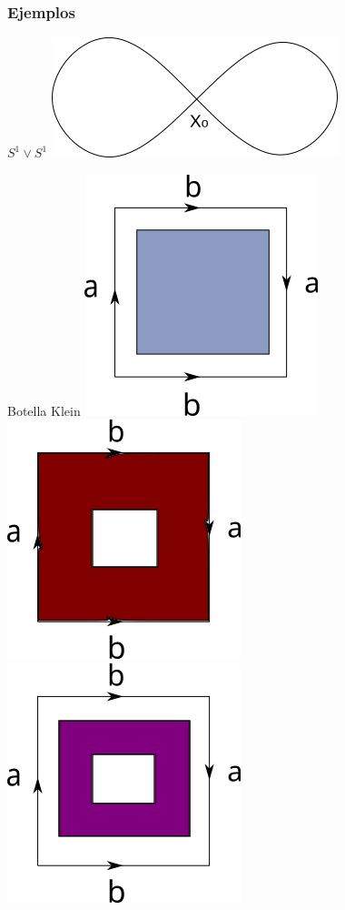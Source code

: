 \documentclass[xetex,mathserif,serif]{beamer}
\begin{document}
  \begin{frame}
    \frametitle{Ejemplos}
    \begin{block}{\(S^1 \vee S^1\)}
      \centering \includegraphics[scale=0.5]{../tesis/imagenes/figura8.png}
    \end{block}

    \pause
    \begin{block}{Botella Klein}
      \centering
      \includegraphics[scale=0.3]{../tesis/imagenes/kleinU.png}
      \hspace{3mm}
      \includegraphics[scale=0.3]{../tesis/imagenes/kleinV.png}
      \hspace{3mm}
      \includegraphics[scale=0.3]{../tesis/imagenes/kleinUV.png}
    \end{block}
  \end{frame}
\end{document}
